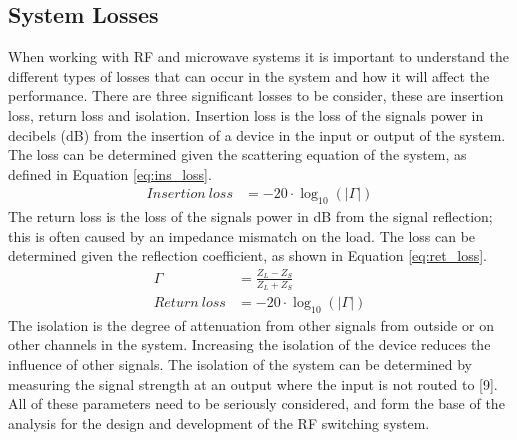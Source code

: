 \documentclass[12pt,openany,a4paper]{book}
\begin{document}
\subsection{System Losses}
When working with RF and microwave systems it is important to understand the different types of losses that can occur in the system and how it will affect the performance. There are three significant losses to be consider, these are insertion loss, return loss and isolation.
Insertion loss is the loss of the signals power in decibels (dB) from the insertion of a device in the input or output of the system. The loss can be determined given the scattering equation of the system, as defined in Equation \ref{eq:ins_loss}.
\begin{align}
Insertion \ loss &= -20\cdot \log_{10}\left( |\Gamma | \right) \label{eq:ins_loss}
\end{align}
The return loss is the loss of the signals power in dB from the signal reflection; this is often caused by an impedance mismatch on the load. The loss can be determined given the reflection coefficient, as shown in Equation \ref{eq:ret_loss}.
\begin{align}
\Gamma &= \frac{Z_L-Z_S}{Z_L+Z_S} \label{eq:ref} \\
Return \ loss &= -20\cdot \log_{10}\left( |\Gamma | \right) \label{eq:ret_loss}
\end{align}
The isolation is the degree of attenuation from other signals from outside or on other channels in the system. Increasing the isolation of the device reduces the influence of other signals. The isolation of the system can be determined by measuring the signal strength at an output where the input is not routed to [9]. All of these parameters need to be seriously considered, and form the base of the analysis for the design and development of the RF switching system.

\end{document}

